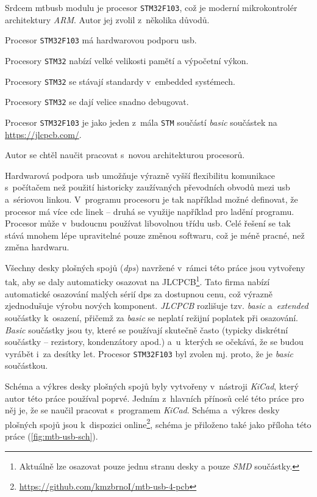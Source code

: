 Srdcem \gls{mtbusb} modulu je procesor \texttt{STM32F103}, což je moderní
mikrokontrolér architektury \textit{ARM}. Autor jej zvolil z~několika důvodů.

\begin{compactenum}
\item Procesor \texttt{STM32F103} má hardwarovou podporu \gls{usb}.
\item Procesory \texttt{STM32} nabízí velké velikosti pamětí a výpočetní výkon.
\item Procesory \texttt{STM32} se stávají standardy v~embedded systémech.
\item Procesory \texttt{STM32} se dají velice snadno debugovat.
\item Procesor \texttt{STM32F103} je jako jeden z~mála \texttt{STM} součástí
	\textit{basic} součástek na \url{https://jlcpcb.com/}.
\item Autor se chtěl naučit pracovat s~novou architekturou procesorů.
\end{compactenum}

Hardwarová podpora \gls{usb} umožňuje výrazně vyšší flexibilitu komunikace
s~počítačem než použití historicky zaužívaných převodních obvodů mezi
\gls{usb} a~sériovou linkou. V~programu procesoru je tak například
možné definovat, že procesor má více \gls{cdc} linek – druhá se využije například
pro ladění programu. Procesor může v~budoucnu používat libovolnou třídu
\gls{usb}. Celé řešení se tak stává mnohem lépe upravitelné pouze změnou
softwaru, což je méně pracné, než změna hardwaru.

Všechny desky plošných spojů (\textit{\gls{dps}}) navržené v~rámci této práce
jsou vytvořeny tak, aby se daly automaticky osazovat na
JLCPCB\footnote{Aktuálně lze osazovat pouze jednu stranu
desky a pouze \textit{SMD} součástky.}. Tato firma nabízí automatické osazování
malých sérií \gls{dps} za dostupnou cenu, což výrazně zjednodušuje výrobu nových
komponent. \textit{JLCPCB} rozlišuje tzv. \textit{basic} a~\textit{extended}
součástky k~osazení, přičemž za \textit{basic} se neplatí režijní poplatek při
osazování. \textit{Basic} součástky jsou ty, které se používají skutečně často
(typicky diskrétní součástky – rezistory, kondenzátory apod.) a~u~kterých se
očekává, že se budou vyrábět i~za desítky let. Procesor \texttt{STM32F103} byl
zvolen mj. proto, že je \textit{basic} součástkou.

Schéma a výkres desky plošných spojů byly vytvořeny v~nástroji \textit{KiCad},
který autor této práce používal poprvé. Jedním z~hlavních přínosů celé této
práce pro něj je, že se naučil pracovat s~programem \textit{KiCad}. Schéma
a~výkres desky plošných spojů jsou k~dispozici
online\footnote{\url{https://github.com/kmzbrnoI/mtb-usb-4-pcb}}, schéma je
přiloženo také jako příloha této práce (\ref{fig:mtb-usb-sch}).

